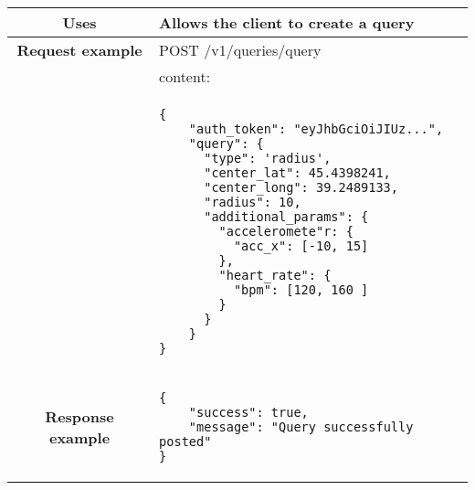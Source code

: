 \begin{adjustwidth}{1cm}{}
\begin{longtable}{|c|l|}
            \textbf{Uses} & Allows the client to create a query \\
            \hline
               \textbf{Request example}
             & POST /v1/queries/query \\
             & content: \\
            & \begin{minipage}[t]{0.5\textwidth}
                \begin{adjustwidth}{1.5cm}{}
                \begin{verbatim}
{
    "auth_token": "eyJhbGciOiJIUz...",
    "query": {
      "type": 'radius',
      "center_lat": 45.4398241,
      "center_long": 39.2489133,
      "radius": 10,
      "additional_params": {
        "acceleromete"r: {
          "acc_x": [-10, 15]
        },
        "heart_rate": {
          "bpm": [120, 160 ]
        }
      }
    }
}
                \end{verbatim}
                \end{adjustwidth}
              \end{minipage} \\
              \hline
             \textbf{Response example} & 
              \begin{minipage}[t]{0.5\textwidth}
                \begin{adjustwidth}{1.5cm}{}
                \begin{verbatim}
{
    "success": true,
    "message": "Query successfully posted"
}
                \end{verbatim}
                \end{adjustwidth}
              \end{minipage} \\
              \hline
        \end{longtable}
    \end{adjustwidth} 
    
